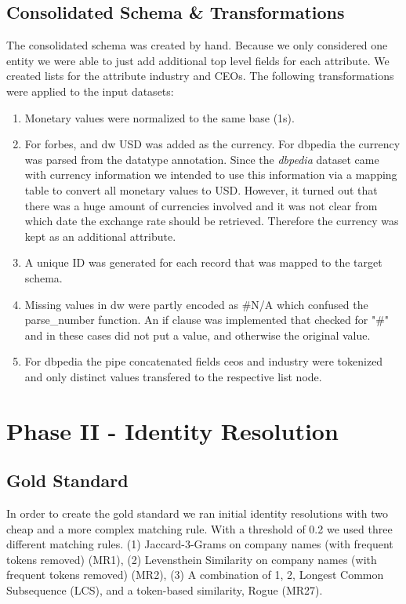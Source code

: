 \documentclass[11pt,titlepage,oneside,openany]{article}
\begin{document}
\subsection{Consolidated Schema \& Transformations}

The consolidated schema was created by hand. Because we only considered one entity we were able to just add additional top level fields for each attribute. We created lists for the attribute industry and CEOs. The following transformations were applied to the input datasets:\begin{enumerate}
	\item Monetary values were normalized to the same base (1s).
	\item For forbes, and dw USD was added as the currency. For dbpedia the currency was parsed from the datatype annotation. Since the \textit{dbpedia} dataset came with currency information we intended to use this information via a mapping table to convert all monetary values to USD. However, it turned out that there was a huge amount of currencies involved and it was not clear from which date the exchange rate should be retrieved. Therefore the currency was kept as an additional attribute.
	\item A unique ID was generated for each record that was mapped to the target schema.
	\item Missing values in dw were partly encoded as \#N/A which confused the parse\_number function. An if clause was implemented that checked for "\#" and in these cases did not put a value, and otherwise the original value.
	\item For dbpedia the pipe concatenated fields ceos and industry were tokenized and only distinct values transfered to the respective list node.
\end{enumerate} 



\section{Phase II - Identity Resolution}

\subsection{Gold Standard}
\label{sec:gold-standard-IR}

In order to create the gold standard we ran initial identity resolutions with two cheap and a more complex matching rule. With a threshold of 0.2 we used three different matching rules. (1) Jaccard-3-Grams on company names (with frequent tokens removed) (MR1), (2) Levensthein Similarity on company names (with frequent tokens removed) (MR2), (3) A combination of 1, 2, Longest Common Subsequence (LCS), and a token-based similarity, Rogue (MR27).
\end{document}
